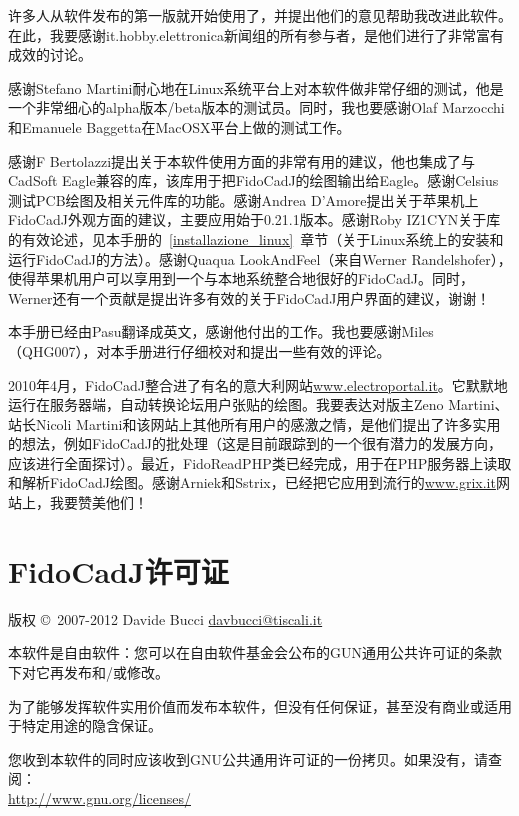 \documentclass[10pt,a4paper,twoside]{scrreprt}
\begin{document}
许多人从软件发布的第一版就开始使用了，并提出他们的意见帮助我改进此软件。在此，我要感谢it.hobby.elettronica新闻组的所有参与者，是他们进行了非常富有成效的讨论。

感谢Stefano Martini耐心地在Linux系统平台上对本软件做非常仔细的测试，他是一个非常细心的alpha版本/beta版本的测试员。同时，我也要感谢Olaf Marzocchi和Emanuele Baggetta在MacOSX平台上做的测试工作。

感谢F Bertolazzi提出关于本软件使用方面的非常有用的建议，他也集成了与CadSoft Eagle兼容的库，该库用于把FidoCadJ的绘图输出给Eagle。感谢Celsius测试PCB绘图及相关元件库的功能。感谢Andrea D'Amore提出关于苹果机上FidoCadJ外观方面的建议，主要应用始于0.21.1版本。感谢Roby IZ1CYN关于库的有效论述，见本手册的~\ref{installazione_linux}~章节（关于Linux系统上的安装和运行FidoCadJ的方法）。感谢Quaqua LookAndFeel（来自Werner Randelshofer），使得苹果机用户可以享用到一个与本地系统整合地很好的FidoCadJ。同时，Werner还有一个贡献是提出许多有效的关于FidoCadJ用户界面的建议，谢谢！

本手册已经由Pasu翻译成英文，感谢他付出的工作。我也要感谢Miles（QHG007），对本手册进行仔细校对和提出一些有效的评论。

2010年4月，FidoCadJ整合进了有名的意大利网站\href{www.electroportal.it}{www.electroportal.it}。它默默地运行在服务器端，自动转换论坛用户张贴的绘图。我要表达对版主Zeno Martini、站长Nicoli Martini和该网站上其他所有用户的感激之情，是他们提出了许多实用的想法，例如FidoCadJ的批处理（这是目前跟踪到的一个很有潜力的发展方向，应该进行全面探讨）。最近，FidoReadPHP类已经完成，用于在PHP服务器上读取和解析FidoCadJ绘图。感谢Arniek和Sstrix，已经把它应用到流行的\href{www.grix.it}{www.grix.it}网站上，我要赞美他们！

\clearpage{}
\chapter*{FidoCadJ许可证} %

版权 \copyright\ 2007-2012 Davide Bucci \href{mailto:davbucci@tiscali.it}{davbucci@tiscali.it}

本软件是自由软件：您可以在自由软件基金会公布的GUN通用公共许可证的条款下对它再发布和/或修改。

为了能够发挥软件实用价值而发布本软件，但没有任何保证，甚至没有商业或适用于特定用途的隐含保证。

您收到本软件的同时应该收到GNU公共通用许可证的一份拷贝。如果没有，请查阅：\\ \href{http://www.gnu.org/licenses/}{http://www.gnu.org/licenses/}
\end{document}
